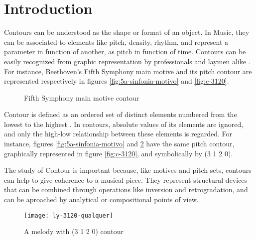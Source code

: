 

\section{Introduction}
\label{sec:introduction}

Contours can be understood as the shape or format of an object. In
Music, they can be associated to elements like pitch, density, rhythm,
and represent a parameter in function of another, as pitch in function
of time. Contours can be easily recognized from graphic representation
by professionals and laymen alike \cite{marvin88:generalized}. For
instance, Beethoven's Fifth Symphony main motive and its pitch contour
are represented respectively in figures \ref{fig:5a-sinfonia-motivo}
and \ref{fig:c-3120}.

\begin{figure}
  \centering

  \subfloat[Contour (3 1 2 0)]{
    \texttt{[image: c-3120]}
    \label{fig:c-3120}
  }
  \caption{Fifth Symphony main motive contour}
  \label{fig:5a-sinfonia}
\end{figure}

Contour is defined as an ordered set of distinct elements numbered
from the lowest to the highest \cite{morris93:directions}. In
contours, absolute values of its elements are ignored, and only the
high-low relationship between these elements is regarded. For
instance, figures \ref{fig:5a-sinfonia-motivo} and \ref{fig:ly-3120}
have the same pitch contour, graphically represented in figure
\ref{fig:c-3120}, and symbolically by (3 1 2 0).

The study of Contour is important because, like motives and pitch
sets, contours can help to give coherence to a musical piece. They
represent structural devices that can be combined through operations
like inversion and retrogradation, and can be aproached by analytical
or compositional points of view.

\begin{figure}
  \centering
  \texttt{[image: ly-3120-qualquer]}
  \caption{A melody with (3 1 2 0) contour}
  \label{fig:ly-3120}
\end{figure}


